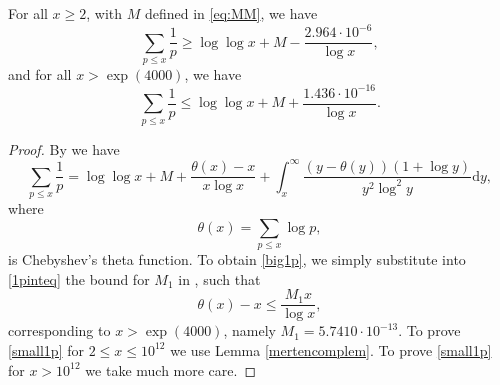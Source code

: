 \documentclass[12pt]{amsart}
\begin{document}
\begin{lemma}\label{mertenlem}
    For all $x\ge 2$, with $M$ defined in \eqref{eq:MM}, we have
    \begin{equation}\label{small1p}
        \sum_{p\le x}\frac{1}{p}\ge\log\log x+M-\frac{2.964\cdot 10^{-6}}{\log x},
    \end{equation}
    and for all $x>\exp(4000)$, we have
    \begin{equation}\label{big1p}
        \sum_{p\le x}\frac{1}{p}\le\log\log x+M+\frac{1.436\cdot 10^{-16}}{\log x}.
    \end{equation}
\end{lemma}
\begin{proof}
    By \cite[(4.20)]{R-S} we have
    \begin{equation}\label{1pinteq}
        \sum_{p\le x}\frac{1}{p}=\log\log x+M+\frac{\theta(x)-x}{x\log x}+\int_x^\infty\frac{(y-\theta(y))(1+\log y)}{y^2\log^2y}\mathrm{d}y,
    \end{equation}
    where 
    \begin{equation}
    \label{eq:theta}
      \theta(x)=\sum_{p\le x}\log p,  
    \end{equation}
    is Chebyshev's theta function. To obtain \eqref{big1p}, we simply substitute into \eqref{1pinteq} the bound for $M_1$ in \cite[Table 15]{Broad}, such that
    $$ \theta(x)-x \le \frac{M_1 x}{\log x},$$
    corresponding to $x>\exp(4000)$, namely $M_1=5.7410\cdot 10^{-13}$. To prove \eqref{small1p} for $2\le x\le 10^{12}$ we use Lemma \ref{mertencomplem}. To prove \eqref{small1p} for $x>10^{12}$ we take much more care. 
    

\end{proof}
\end{document}
